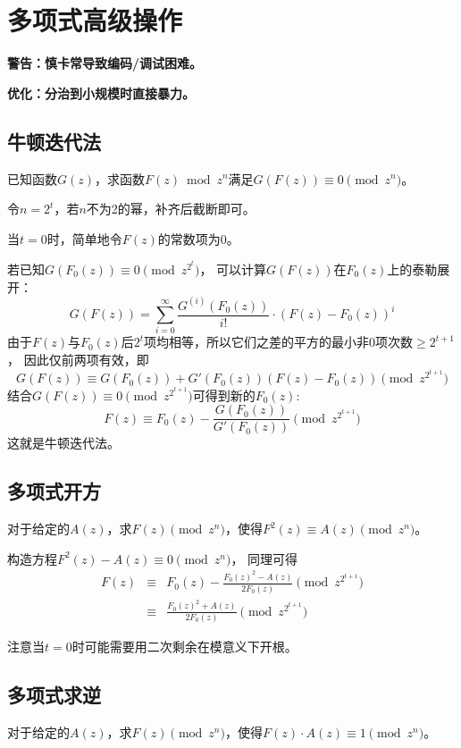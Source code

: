 \section{多项式高级操作}
{\bfseries 警告：慎卡常导致编码/调试困难。}

{\bfseries 优化：分治到小规模时直接暴力。}
\subsection{牛顿迭代法}
已知函数$G(z)$，求函数$F(z) \bmod{z^n}$满足$G(F(z))\equiv 0 \pmod{z^n}$。

令$n=2^t$，若$n$不为2的幂，补齐后截断即可。

当$t=0$时，简单地令$F(z)$的常数项为0。

若已知$G(F_0(z)) \equiv 0\pmod{z^{2^t}}$，
可以计算$G(F(z))$在$F_0(z)$上的泰勒展开：
\begin{displaymath}
    G(F(z))=\sum_{i=0}^\infty{\frac{G^{(i)}(F_0(z))}{i!}\cdot (F(z)-F_0(z))^i}
\end{displaymath}
由于$F(z)$与$F_0(z)$后$2^t$项均相等，所以它们之差的平方的最小非0项次数$\geq 2^{t+1}$，
因此仅前两项有效，即
\begin{displaymath}
    G(F(z))\equiv G(F_0(z))+G'(F_0(z))(F(z)-F_0(z)) \pmod{z^{2^{t+1}}}
\end{displaymath}
结合$G(F(z))\equiv 0 \pmod{z^{2^{t+1}}}$可得到新的$F_0(z)$:
\begin{displaymath}
    F(z)\equiv F_0(z)-\frac{G(F_0(z))}{G'(F_0(z))} \pmod{z^{2^{t+1}}}
\end{displaymath}
这就是牛顿迭代法。
\subsection{多项式开方}
对于给定的$A(z)$，求$F(z) \pmod z^n$，使得$F^2(z)\equiv A(z)\pmod{z^n}$。

构造方程$F^2(z)-A(z)\equiv 0\pmod{z^n}$，
同理可得
\begin{eqnarray*}
    F(z)&\equiv& F_0(z)-\frac{F_0(z)^2-A(z)}{2F_0(z)} \pmod{z^{2^{t+1}}}\\
    &\equiv& \frac{F_0(z)^2+A(z)}{2F_0(z)} \pmod{z^{2^{t+1}}}
\end{eqnarray*}

注意当$t=0$时可能需要用二次剩余在模意义下开根。

\subsection{多项式求逆}
对于给定的$A(z)$，求$F(z) \pmod z^n$，使得$F(z)\cdot A(z)\equiv 1\pmod{z^n}$。

